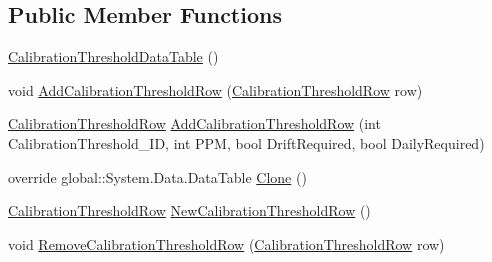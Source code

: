 \subsection*{Public Member Functions}
\begin{DoxyCompactItemize}
\item 
\hyperlink{class_env_int_1_1_win32_1_1_field_tech_1_1_manager_1_1_data_sets_1_1_guide_ware_mobile_data_set_e4a98fb4b531becb042ae997c9d8a15c_a9af66373b649daa9c41769cdcc3dce95}{Calibration\+Threshold\+Data\+Table} ()
\item 
void \hyperlink{class_env_int_1_1_win32_1_1_field_tech_1_1_manager_1_1_data_sets_1_1_guide_ware_mobile_data_set_e4a98fb4b531becb042ae997c9d8a15c_a22777bcdf991c172fd73645032697544}{Add\+Calibration\+Threshold\+Row} (\hyperlink{class_env_int_1_1_win32_1_1_field_tech_1_1_manager_1_1_data_sets_1_1_guide_ware_mobile_data_set_1_1_calibration_threshold_row}{Calibration\+Threshold\+Row} row)
\item 
\hyperlink{class_env_int_1_1_win32_1_1_field_tech_1_1_manager_1_1_data_sets_1_1_guide_ware_mobile_data_set_1_1_calibration_threshold_row}{Calibration\+Threshold\+Row} \hyperlink{class_env_int_1_1_win32_1_1_field_tech_1_1_manager_1_1_data_sets_1_1_guide_ware_mobile_data_set_e4a98fb4b531becb042ae997c9d8a15c_a291583bda5bbd2b987e3ccca750ab4c4}{Add\+Calibration\+Threshold\+Row} (int Calibration\+Threshold\+\_\+\+I\+D, int P\+P\+M, bool Drift\+Required, bool Daily\+Required)
\item 
override global\+::\+System.\+Data.\+Data\+Table \hyperlink{class_env_int_1_1_win32_1_1_field_tech_1_1_manager_1_1_data_sets_1_1_guide_ware_mobile_data_set_e4a98fb4b531becb042ae997c9d8a15c_ae85bcc6395997c6b0aae82a135aa8e04}{Clone} ()
\item 
\hyperlink{class_env_int_1_1_win32_1_1_field_tech_1_1_manager_1_1_data_sets_1_1_guide_ware_mobile_data_set_1_1_calibration_threshold_row}{Calibration\+Threshold\+Row} \hyperlink{class_env_int_1_1_win32_1_1_field_tech_1_1_manager_1_1_data_sets_1_1_guide_ware_mobile_data_set_e4a98fb4b531becb042ae997c9d8a15c_ae760520f1dd0af558d8396c81289a498}{New\+Calibration\+Threshold\+Row} ()
\item 
void \hyperlink{class_env_int_1_1_win32_1_1_field_tech_1_1_manager_1_1_data_sets_1_1_guide_ware_mobile_data_set_e4a98fb4b531becb042ae997c9d8a15c_a31779a58fa8a53c5068ff5afd02dd8fc}{Remove\+Calibration\+Threshold\+Row} (\hyperlink{class_env_int_1_1_win32_1_1_field_tech_1_1_manager_1_1_data_sets_1_1_guide_ware_mobile_data_set_1_1_calibration_threshold_row}{Calibration\+Threshold\+Row} row)

\end{DoxyCompactItemize}
